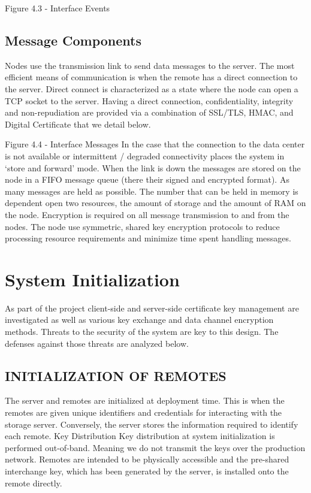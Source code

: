    Figure 4.3 - Interface Events
\subsection{Message Components}
   Nodes use the transmission link to send data messages to the server. The most efficient means of communication is when the remote has a direct connection to the server. Direct connect is characterized as a state where the node can open a TCP socket to the server. Having a direct connection, confidentiality, integrity and non-repudiation are provided via a combination of SSL/TLS, HMAC, and Digital Certificate that we detail below.
    
    Figure 4.4 - Interface Messages
In the case that the connection to the data center is not available or intermittent / degraded connectivity places the system in ‘store and forward’ mode. 
When the link is down the messages are stored on the node in a FIFO message queue (there their signed and encrypted format). As many messages are held as possible. The number that can be held in memory is dependent open two resources, the amount of storage and the amount of RAM on the node.
Encryption is required on all message transmission to and from the nodes. The node use symmetric, shared key encryption protocols to reduce processing resource requirements and minimize time spent handling messages. 

\section{System Initialization}
    As part of the project client-side and server-side certificate key management are investigated as well as various key exchange and data channel encryption methods. Threats to the security of the system are key to this design. The defenses against those threats are analyzed below.
\subsection{INITIALIZATION OF REMOTES}
    The server and remotes are initialized at deployment time. This is when the remotes are given unique identifiers and credentials for interacting with the storage server. Conversely, the server stores the information required to identify each remote.  
    Key Distribution
    Key distribution at system initialization is performed out-of-band. Meaning we do not transmit the keys over the production network. Remotes are intended to be physically accessible and the pre-shared interchange key, which has been generated by the server, is installed onto the remote directly.

